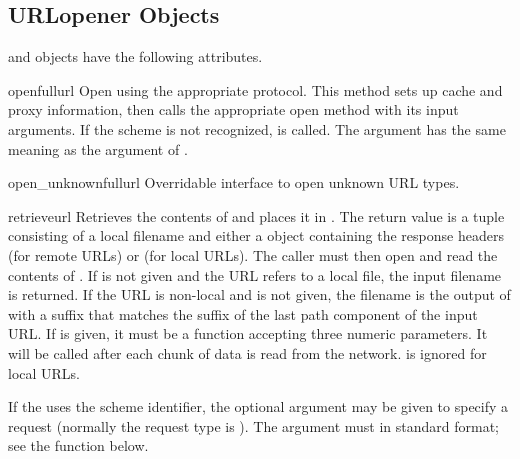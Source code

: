 \subsection{URLopener Objects \label{urlopener-objs}}

 and  objects have the
following attributes.

\begin{methoddesc}[URLopener]{open}{fullurl}
Open  using the appropriate protocol.  This method sets
up cache and proxy information, then calls the appropriate open method with
its input arguments.  If the scheme is not recognized,
 is called.  The  argument
has the same meaning as the  argument of .
\end{methoddesc}

\begin{methoddesc}[URLopener]{open_unknown}{fullurl}
Overridable interface to open unknown URL types.
\end{methoddesc}

\begin{methoddesc}[URLopener]{retrieve}{url}
Retrieves the contents of  and places it in .  The
return value is a tuple consisting of a local filename and either a
 object containing the response headers (for remote
URLs) or  (for local URLs).  The caller must then open and read the
contents of .  If  is not given and the URL
refers to a local file, the input filename is returned.  If the URL is
non-local and  is not given, the filename is the output of
 with a suffix that matches the suffix of the last
path component of the input URL.  If  is given, it must be
a function accepting three numeric parameters.  It will be called after each
chunk of data is read from the network.   is ignored for
local URLs.

If the  uses the  scheme identifier, the optional
 argument may be given to specify a  request
(normally the request type is ).  The  argument
must in standard  format;
see the  function below.
\end{methoddesc}

